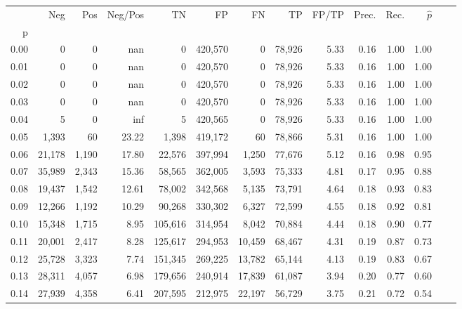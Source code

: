 \begin{tabular}{rrrrrrrrrrrrrr}
\toprule
{} &     Neg &    Pos & Neg/Pos &       TN &       FP &      FN &      TP & FP/TP & Prec. &  Rec. & $\hat{p}$ \\
p    &         &        &         &          &          &         &         &       &       &       &           \\
\midrule
0.00 &       0 &      0 &     nan &        0 &  420,570 &       0 &  78,926 &  5.33 &  0.16 &  1.00 &      1.00 \\
0.01 &       0 &      0 &     nan &        0 &  420,570 &       0 &  78,926 &  5.33 &  0.16 &  1.00 &      1.00 \\
0.02 &       0 &      0 &     nan &        0 &  420,570 &       0 &  78,926 &  5.33 &  0.16 &  1.00 &      1.00 \\
0.03 &       0 &      0 &     nan &        0 &  420,570 &       0 &  78,926 &  5.33 &  0.16 &  1.00 &      1.00 \\
0.04 &       5 &      0 &     inf &        5 &  420,565 &       0 &  78,926 &  5.33 &  0.16 &  1.00 &      1.00 \\
0.05 &   1,393 &     60 &   23.22 &    1,398 &  419,172 &      60 &  78,866 &  5.31 &  0.16 &  1.00 &      1.00 \\
0.06 &  21,178 &  1,190 &   17.80 &   22,576 &  397,994 &   1,250 &  77,676 &  5.12 &  0.16 &  0.98 &      0.95 \\
0.07 &  35,989 &  2,343 &   15.36 &   58,565 &  362,005 &   3,593 &  75,333 &  4.81 &  0.17 &  0.95 &      0.88 \\
0.08 &  19,437 &  1,542 &   12.61 &   78,002 &  342,568 &   5,135 &  73,791 &  4.64 &  0.18 &  0.93 &      0.83 \\
0.09 &  12,266 &  1,192 &   10.29 &   90,268 &  330,302 &   6,327 &  72,599 &  4.55 &  0.18 &  0.92 &      0.81 \\
0.10 &  15,348 &  1,715 &    8.95 &  105,616 &  314,954 &   8,042 &  70,884 &  4.44 &  0.18 &  0.90 &      0.77 \\
0.11 &  20,001 &  2,417 &    8.28 &  125,617 &  294,953 &  10,459 &  68,467 &  4.31 &  0.19 &  0.87 &      0.73 \\
0.12 &  25,728 &  3,323 &    7.74 &  151,345 &  269,225 &  13,782 &  65,144 &  4.13 &  0.19 &  0.83 &      0.67 \\
0.13 &  28,311 &  4,057 &    6.98 &  179,656 &  240,914 &  17,839 &  61,087 &  3.94 &  0.20 &  0.77 &      0.60 \\
0.14 &  27,939 &  4,358 &    6.41 &  207,595 &  212,975 &  22,197 &  56,729 &  3.75 &  0.21 &  0.72 &      0.54 \\

\end{tabular}
